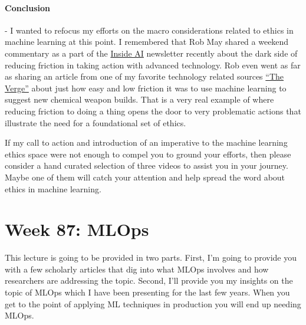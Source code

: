 \documentclass{article}
\begin{document}
\paragraph{Conclusion} - I wanted to refocus my efforts on the macro considerations related to ethics in machine learning at this point. I remembered that Rob May shared a weekend commentary as a part of the \href{https://inside.com/campaigns/inside-ai-31781/sections/inside-ai-commentary-by-robmay-275419}{Inside AI} newsletter recently about the dark side of reducing friction in taking action with advanced technology. Rob even went as far as sharing an article from one of my favorite technology related sources \href{https://www.theverge.com/2022/3/17/22983197/ai-new-possible-chemical-weapons-generative-models-vx}{“The Verge”} about just how easy and low friction it was to use machine learning to suggest new chemical weapon builds. That is a very real example of where reducing friction to doing a thing opens the door to very problematic actions that illustrate the need for a foundational set of ethics.

If my call to action and introduction of an imperative to the machine learning ethics space were not enough to compel you to ground your efforts, then please consider a hand curated selection of three videos to assist you in your journey. Maybe one of them will catch your attention and help spread the word about ethics in machine learning.

\section{Week 87: MLOps}
This lecture is going to be provided in two parts. First, I’m going to provide you with a few scholarly articles that dig into what MLOps involves and how researchers are addressing the topic. Second, I’ll provide you my insights on the topic of MLOps which I have been presenting for the last few years. When you get to the point of applying ML techniques in production you will end up needing MLOps. 
\end{document}

